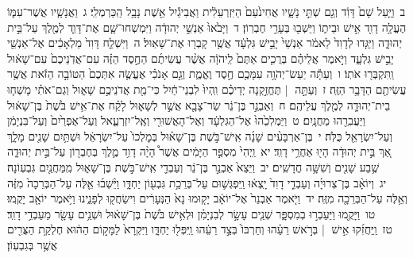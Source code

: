 \documentclass[18pt]{article}
\begin{document}
 {\loc ב~}וַיַּ֤עַל שָׁם֙ דָּוִ֔ד וְגַ֖ם שְׁתֵּ֣י נָשָׁ֑יו אֲחִינֹ֙עַם֙ הַיִּזְרְעֵלִ֔ית וַאֲבִיגַ֕יִל אֵ֖שֶׁת נָבָ֥ל הַֽכַּרְמְלִֽי׃ \startlock
 {\loc ג~}וַאֲנָשָׁ֧יו אֲשֶׁר־עִמּ֛וֹ הֶעֱלָ֥ה דָוִ֖ד אִ֣ישׁ וּבֵית֑וֹ וַיֵּשְׁב֖וּ בְּעָרֵ֥י חֶבְרֽוֹן׃ \startlock
 {\loc ד~}וַיָּבֹ֙אוּ֙ אַנְשֵׁ֣י יְהוּדָ֔ה וַיִּמְשְׁחוּ־שָׁ֧ם אֶת־דָּוִ֛ד לְמֶ֖לֶךְ עַל־בֵּ֣ית יְהוּדָ֑ה וַיַּגִּ֤דוּ לְדָוִד֙ לֵאמֹ֔ר אַנְשֵׁי֙ יָבֵ֣ישׁ גִּלְעָ֔ד אֲשֶׁ֥ר קָבְר֖וּ אֶת־שָׁאֽוּל׃ \startlock
 {\loc ה~}וַיִּשְׁלַ֤ח דָּוִד֙ מַלְאָכִ֔ים אֶל־אַנְשֵׁ֖י יָבֵ֣ישׁ גִּלְעָ֑ד וַיֹּ֣אמֶר אֲלֵיהֶ֗ם בְּרֻכִ֤ים אַתֶּם֙ לַֽיהֹוָ֔ה אֲשֶׁ֨ר עֲשִׂיתֶ֜ם הַחֶ֣סֶד הַזֶּ֗ה עִם־אֲדֹֽנֵיכֶם֙ עִם־שָׁא֔וּל וַֽתִּקְבְּר֖וּ אֹתֽוֹ׃ \startlock
 {\loc ו~}וְעַתָּ֕ה יַעַשׂ־יְהֹוָ֥ה עִמָּכֶ֖ם חֶ֣סֶד וֶאֱמֶ֑ת וְגַ֣ם אָנֹכִ֗י אֶעֱשֶׂ֤ה אִתְּכֶם֙ הַטּוֹבָ֣ה הַזֹּ֔את אֲשֶׁ֥ר עֲשִׂיתֶ֖ם הַדָּבָ֥ר הַזֶּֽה׃ \startlock
 {\loc ז~}וְעַתָּ֣ה  |  תֶּחֱזַ֣קְנָה יְדֵיכֶ֗ם וִֽהְיוּ֙ לִבְנֵי־חַ֔יִל כִּי־מֵ֖ת אֲדֹנֵיכֶ֣ם שָׁא֑וּל וְגַם־אֹתִ֗י מָשְׁח֧וּ בֵית־יְהוּדָ֛ה לְמֶ֖לֶךְ עֲלֵיהֶֽם׃ \startlock
 {\loc ח~}וְאַבְנֵ֣ר בֶּן־נֵ֔ר שַׂר־צָבָ֖א אֲשֶׁ֣ר לְשָׁא֑וּל לָקַ֗ח אֶת־אִ֥ישׁ בֹּ֙שֶׁת֙ בֶּן־שָׁא֔וּל וַיַּעֲבִרֵ֖הוּ מַחֲנָֽיִם׃ \startlock
 {\loc ט~}וַיַּמְלִכֵ֙הוּ֙ אֶל־הַגִּלְעָ֔ד וְאֶל־הָאֲשׁוּרִ֖י וְאֶֽל־יִזְרְעֶ֑אל וְעַל־אֶפְרַ֙יִם֙ וְעַל־בִּנְיָמִ֔ן וְעַל־יִשְׂרָאֵ֖ל כֻּלֹּֽה׃ \startlock
 {\loc י~}בֶּן־אַרְבָּעִ֨ים שָׁנָ֜ה אִֽישׁ־בֹּ֣שֶׁת בֶּן־שָׁא֗וּל בְּמׇלְכוֹ֙ עַל־יִשְׂרָאֵ֔ל וּשְׁתַּ֥יִם שָׁנִ֖ים מָלָ֑ךְ אַ֚ךְ בֵּ֣ית יְהוּדָ֔ה הָי֖וּ אַחֲרֵ֥י דָוִֽד׃ \startlock
 {\loc יא~}וַֽיְהִי֙ מִסְפַּ֣ר הַיָּמִ֔ים אֲשֶׁר֩ הָיָ֨ה דָוִ֥ד מֶ֛לֶךְ בְּחֶבְר֖וֹן עַל־בֵּ֣ית יְהוּדָ֑ה שֶׁ֥בַע שָׁנִ֖ים וְשִׁשָּׁ֥ה חֳדָשִֽׁים׃ \startlock
 {\loc יב~}וַיֵּצֵא֙ אַבְנֵ֣ר בֶּן־נֵ֔ר וְעַבְדֵ֖י אִֽישׁ־בֹּ֣שֶׁת בֶּן־שָׁא֑וּל מִֽמַּחֲנַ֖יִם גִּבְעֽוֹנָה׃ \startlock
 {\loc יג~}וְיוֹאָ֨ב בֶּן־צְרוּיָ֜ה וְעַבְדֵ֤י דָוִד֙ יָֽצְא֔וּ וַֽיִּפְגְּשׁ֛וּם עַל־בְּרֵכַ֥ת גִּבְע֖וֹן יַחְדָּ֑ו וַיֵּ֨שְׁב֜וּ אֵ֤לֶּה עַל־הַבְּרֵכָה֙ מִזֶּ֔ה וְאֵ֥לֶּה עַל־הַבְּרֵכָ֖ה מִזֶּֽה׃ \startlock
 {\loc יד~}וַיֹּ֤אמֶר אַבְנֵר֙ אֶל־יוֹאָ֔ב יָק֤וּמוּ נָא֙ הַנְּעָרִ֔ים וִישַׂחֲק֖וּ לְפָנֵ֑ינוּ וַיֹּ֥אמֶר יוֹאָ֖ב יָקֻֽמוּ׃ \startlock
 {\loc טו~}וַיָּקֻ֖מוּ וַיַּעַבְר֣וּ בְמִסְפָּ֑ר שְׁנֵ֧ים עָשָׂ֣ר לְבִנְיָמִ֗ן וּלְאִ֥ישׁ בֹּ֙שֶׁת֙ בֶּן־שָׁא֔וּל וּשְׁנֵ֥ים עָשָׂ֖ר מֵעַבְדֵ֥י דָוִֽד׃ \startlock
 {\loc טז~}וַֽיַּחֲזִ֜קוּ אִ֣ישׁ  |  בְּרֹ֣אשׁ רֵעֵ֗הוּ וְחַרְבּוֹ֙ בְּצַ֣ד רֵעֵ֔הוּ וַֽיִּפְּל֖וּ יַחְדָּ֑ו וַיִּקְרָא֙ לַמָּק֣וֹם הַה֔וּא חֶלְקַ֥ת הַצֻּרִ֖ים אֲשֶׁ֥ר בְּגִבְעֽוֹן׃ \startlock
\end{document}
